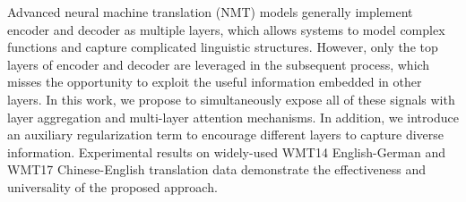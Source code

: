 Advanced neural machine translation (NMT) models generally implement encoder and decoder as multiple layers, which allows systems to model complex functions and capture complicated linguistic structures. However, only the top layers of encoder and decoder are leveraged in the subsequent process, which misses the opportunity to exploit the useful information embedded in other layers. In this work, we propose to simultaneously expose all of these signals with layer aggregation and multi-layer attention mechanisms. In addition, we introduce an auxiliary regularization term to encourage different layers to capture diverse information. Experimental results on widely-used WMT14 English-German and WMT17 Chinese-English translation data demonstrate the effectiveness and universality of the proposed approach.
